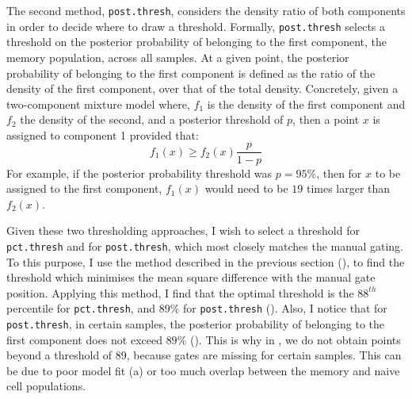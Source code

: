 The second method, \texttt{post.thresh}, considers the density ratio of both components in order to decide where to draw a threshold.
Formally, \texttt{post.thresh} selects a threshold on the posterior probability of belonging to the first component, the memory population, across all samples.
At a given point, the posterior probability of belonging to the first component is defined as the ratio of the density of the first component,
over that of the total density.
Concretely, given a two-component mixture model where, $f_1$ is the density of the first component and $f_2$ the density of the second, and a posterior threshold of $p$,
then a point $x$ is assigned to component 1 provided that:
\[
  f_1(x) \geq f_2(x) \dfrac{p}{1-p}
\]
For example, if the posterior probability threshold was $p=95\%$, then for $x$ to be assigned to the first component, $f_1(x)$ would need to be $19$ times larger than $f_2(x)$.

Given these two thresholding approaches, I wish to select a threshold for \texttt{pct.thresh} and for \texttt{post.thresh}, which most closely matches the manual gating.
To this purpose, I use the method described in the previous section (), to find the threshold which minimises the mean square difference with the manual gate position.
Applying this method, I find that the optimal threshold is the $88^{th}$ percentile for \texttt{pct.thresh},
and $89\%$ for \texttt{post.thresh} ().
Also, I notice that for \texttt{post.thresh}, in certain samples,  the posterior probability
of belonging to the first component does not exceed $89\%$ ().
This is why in , we do not obtain points beyond a threshold of 89, because gates are missing for certain samples.
This can be due to poor model fit (a) or too much overlap between the memory and naive cell populations.

